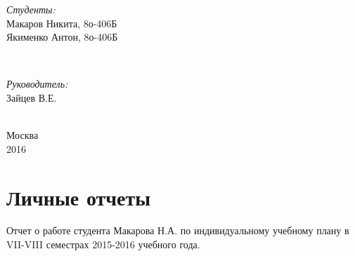 \documentclass[a4paper,12pt]{article}
\begin{document}
\begin{titlepage}

\begin{minipage}{0.4\textwidth}
\begin{flushleft} \large
\emph{Студенты:}\\
Макаров Никита, 8о-406Б\\Якименко Антон, 8о-406Б
\end{flushleft}
\end{minipage}
~
\begin{minipage}{0.4\textwidth}
\begin{flushright} \large
\emph{Руководитель:} \\
Зайцев В.Е.
\end{flushright}
\end{minipage}\\[2cm]


\vspace{190px}
{\large Москва\\2016}\\[2cm] %

\vfill %

\end{titlepage}



\tableofcontents
\newpage



\section{Личные отчеты}

Отчет о работе студента Макарова Н.А. по индивидуальному учебному плану в VII-VIII семестрах 2015-2016 учебного года.
\end{document}
